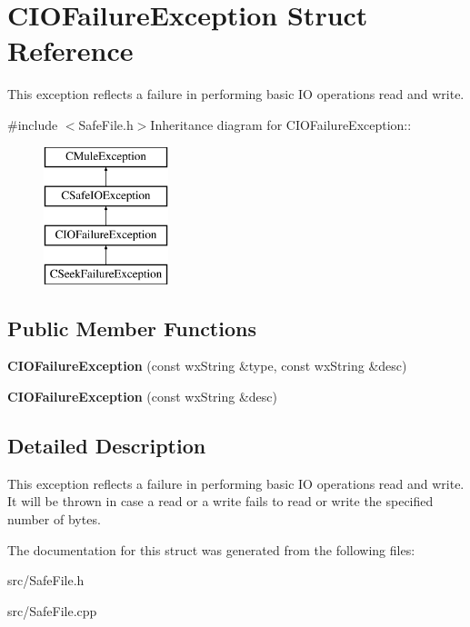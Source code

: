 \section{CIOFailureException Struct Reference}
\label{structCIOFailureException}


This exception reflects a failure in performing basic IO operations read and write.  


{\ttfamily \#include $<$SafeFile.h$>$}Inheritance diagram for CIOFailureException::\begin{figure}[H]
\begin{center}
\leavevmode
\includegraphics[height=4cm]{structCIOFailureException}
\end{center}
\end{figure}
\subsection*{Public Member Functions}
\begin{DoxyCompactItemize}
\item 
{\bfseries CIOFailureException} (const wxString \&type, const wxString \&desc)\label{structCIOFailureException_ae8a308276643303f9be447afb3064109}

\item 
{\bfseries CIOFailureException} (const wxString \&desc)\label{structCIOFailureException_a70485c52494b09febe7de00e6bcd3bd9}

\end{DoxyCompactItemize}


\subsection{Detailed Description}
This exception reflects a failure in performing basic IO operations read and write. It will be thrown in case a read or a write fails to read or write the specified number of bytes. 

The documentation for this struct was generated from the following files:\begin{DoxyCompactItemize}
\item 
src/SafeFile.h\item 
src/SafeFile.cpp\end{DoxyCompactItemize}
